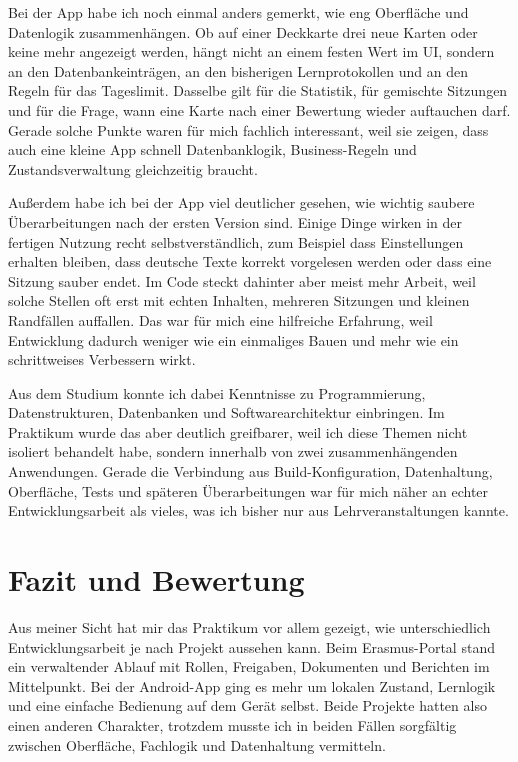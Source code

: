 \documentclass{Vorlage}
\begin{document}
Bei der App habe ich noch einmal anders gemerkt, wie eng Oberfl\"ache und Datenlogik zusammenh\"angen. Ob auf einer Deckkarte drei neue Karten oder keine mehr angezeigt werden, h\"angt nicht an einem festen Wert im UI, sondern an den Datenbankeintr\"agen, an den bisherigen Lernprotokollen und an den Regeln f\"ur das Tageslimit. Dasselbe gilt f\"ur die Statistik, f\"ur gemischte Sitzungen und f\"ur die Frage, wann eine Karte nach einer Bewertung wieder auftauchen darf. Gerade solche Punkte waren f\"ur mich fachlich interessant, weil sie zeigen, dass auch eine kleine App schnell Datenbanklogik, Business-Regeln und Zustandsverwaltung gleichzeitig braucht.

Au\ss{}erdem habe ich bei der App viel deutlicher gesehen, wie wichtig saubere \"Uberarbeitungen nach der ersten Version sind. Einige Dinge wirken in der fertigen Nutzung recht selbstverst\"andlich, zum Beispiel dass Einstellungen erhalten bleiben, dass deutsche Texte korrekt vorgelesen werden oder dass eine Sitzung sauber endet. Im Code steckt dahinter aber meist mehr Arbeit, weil solche Stellen oft erst mit echten Inhalten, mehreren Sitzungen und kleinen Randf\"allen auffallen. Das war f\"ur mich eine hilfreiche Erfahrung, weil Entwicklung dadurch weniger wie ein einmaliges Bauen und mehr wie ein schrittweises Verbessern wirkt.

Aus dem Studium konnte ich dabei Kenntnisse zu Programmierung, Datenstrukturen, Datenbanken und Softwarearchitektur einbringen. Im Praktikum wurde das aber deutlich greifbarer, weil ich diese Themen nicht isoliert behandelt habe, sondern innerhalb von zwei zusammenh\"angenden Anwendungen. Gerade die Verbindung aus Build-Konfiguration, Datenhaltung, Oberfl\"ache, Tests und sp\"ateren \"Uberarbeitungen war f\"ur mich n\"aher an echter Entwicklungsarbeit als vieles, was ich bisher nur aus Lehrveranstaltungen kannte.

\renewcommand{\thesection}{\Roman{section}}

\section{Fazit und Bewertung}

Aus meiner Sicht hat mir das Praktikum vor allem gezeigt, wie unterschiedlich Entwicklungsarbeit je nach Projekt aussehen kann. Beim Erasmus-Portal stand ein verwaltender Ablauf mit Rollen, Freigaben, Dokumenten und Berichten im Mittelpunkt. Bei der Android-App ging es mehr um lokalen Zustand, Lernlogik und eine einfache Bedienung auf dem Ger\"at selbst. Beide Projekte hatten also einen anderen Charakter, trotzdem musste ich in beiden F\"allen sorgf\"altig zwischen Oberfl\"ache, Fachlogik und Datenhaltung vermitteln.
\end{document}
